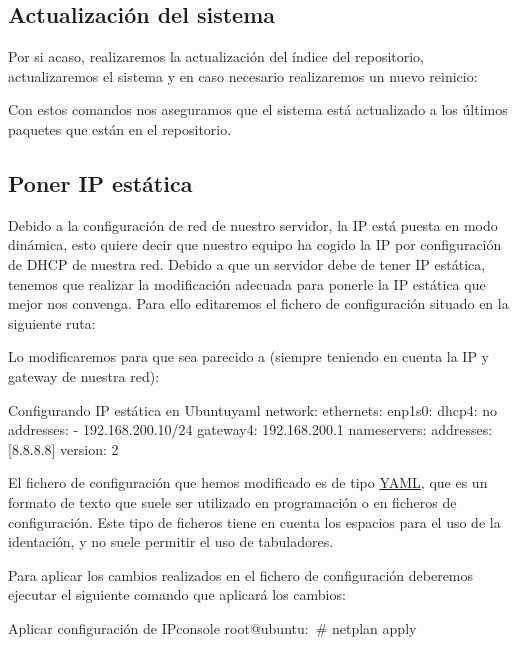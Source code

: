 \subsection{Actualización del sistema}
Por si acaso, realizaremos la actualización del índice del repositorio, actualizaremos el sistema y en caso necesario realizaremos un nuevo reinicio:


Con estos comandos nos aseguramos que el sistema está actualizado a los últimos paquetes que están en el repositorio.


\hypertarget{configurar_ip_estatica_ubuntu}{}
\subsection{Poner IP estática}
Debido a la configuración de red de nuestro servidor, la IP está puesta en modo dinámica, esto quiere decir que nuestro equipo ha cogido la IP por configuración de DHCP de nuestra red. Debido a que un servidor debe de tener IP estática, tenemos que realizar la modificación adecuada para ponerle la IP estática que mejor nos convenga. Para ello editaremos el fichero de configuración situado en la siguiente ruta: 

Lo modificaremos para que sea parecido a (siempre teniendo en cuenta la IP y gateway de nuestra red):


\begin{mycode}{Configurando IP estática en Ubuntu}{yaml}{}
network:
  ethernets:
    enp1s0:
      dhcp4: no
      addresses:
      - 192.168.200.10/24
      gateway4: 192.168.200.1
      nameservers:
        addresses: [8.8.8.8]
  version: 2
\end{mycode}

El fichero de configuración que hemos modificado es de tipo \href{https://es.wikipedia.org/wiki/YAML}{YAML}, que es un formato de texto que suele ser utilizado en programación o en ficheros de configuración. Este tipo de ficheros tiene en cuenta los espacios para el uso de la identación, y no suele permitir el uso de tabuladores.

Para aplicar los cambios realizados en el fichero de configuración deberemos ejecutar el siguiente comando que aplicará los cambios:

\begin{mycode}{Aplicar configuración de IP}{console}{}
root@ubuntu:~# netplan apply
\end{mycode}

\clearpage